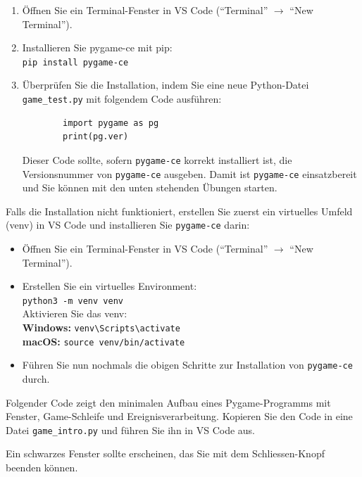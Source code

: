 \begin{enumerate}
    \item Öffnen Sie ein Terminal-Fenster in VS Code (\enquote{Terminal} $\rightarrow$ \enquote{New Terminal}).
    \item Installieren Sie pygame-ce mit pip:\\
          \lstinline|pip install pygame-ce|
    \item Überprüfen Sie die Installation, indem Sie eine neue Python-Datei \texttt{game\_test.py} mit folgendem Code ausführen:
          \begin{lstlisting}
        import pygame as pg
        print(pg.ver)
        \end{lstlisting}
          Dieser Code sollte, sofern \texttt{pygame-ce} korrekt installiert ist, die Versionsnummer von \texttt{pygame-ce} ausgeben. Damit ist \texttt{pygame-ce} einsatzbereit und Sie können mit den unten stehenden Übungen starten.
\end{enumerate}

\begin{myattention}
    Falls die Installation nicht funktioniert, erstellen Sie zuerst ein virtuelles Umfeld (venv) in VS Code und installieren Sie \texttt{pygame-ce} darin:
    \begin{itemize}
        \item Öffnen Sie ein Terminal-Fenster in VS Code (\enquote{Terminal} $\rightarrow$ \enquote{New Terminal}).
        \item Erstellen Sie ein virtuelles Environment:\\
              \lstinline|python3 -m venv venv|\\
              Aktivieren Sie das venv:\\
              \textbf{Windows:} \lstinline|venv\Scripts\activate|\\
              \textbf{macOS:} \lstinline|source venv/bin/activate|
        \item Führen Sie nun nochmals die obigen Schritte zur Installation von \texttt{pygame-ce} durch.
    \end{itemize}
\end{myattention}

\begin{myexample}
Folgender Code zeigt den minimalen Aufbau eines Pygame-Programms mit Fenster, Game-Schleife und Ereignisverarbeitung. Kopieren Sie den Code in eine Datei \texttt{game\_intro.py} und führen Sie ihn in VS Code aus.

Ein schwarzes Fenster sollte erscheinen, das Sie mit dem Schliessen-Knopf beenden können.
\end{myexample}


